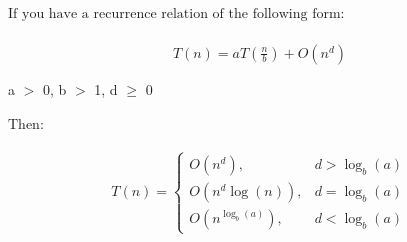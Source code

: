 $\textrm{If you have a recurrence relation of the following form: }$ \\ \\
\begin{gather*}
T(n) = a T(\frac{n}{b}) + O(n^d) \\ \\
\end{gather*}
a $>$ 0, b $>$ 1, d $\geq$ 0 \\ \\
$\textrm{Then: }$ \\ \\
\begin{gather*}
  T(n)=\begin{cases}
    O(n^d), & d > \log_b(a) \\
    O(n^d\log(n)), & d = \log_b(a) \\
    O(n^{\log_b(a)}), & d < \log_b(a)
  \end{cases}
\end{gather*}

